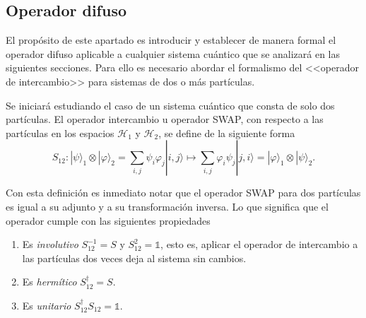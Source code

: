 \subsection{Operador difuso}\label{subsec:Cap2OperadorDifusas} %

El propósito de este apartado es introducir y establecer de manera formal el operador difuso aplicable a cualquier sistema cuántico que se analizará en las siguientes secciones. Para ello es necesario abordar el formalismo del <<operador de intercambio>> para sistemas de dos o más partículas.



Se iniciará estudiando el caso de un sistema cuántico que consta de solo dos partículas. El operador intercambio u operador SWAP, con respecto a las partículas en los espacios $\mathcal{H}_1$ y $\mathcal{H}_2$, se define de la siguiente forma\begin{equation}\label{swap}
S_{12}: |\psi\rangle_{1}\otimes |\varphi \rangle_{2}=\sum_{i,j}\psi_i\varphi_j|i,j\rangle \longmapsto     \sum_{i,j}\varphi_i\psi_j|j,i\rangle= |\varphi\rangle_{1}\otimes |\psi \rangle_{2}.
\end{equation} 

Con esta definición es inmediato notar que el operador SWAP para dos partículas es igual a su adjunto y a su transformación inversa. Lo que significa que el operador cumple con las siguientes propiedades\begin{enumerate}
    \item Es \textit{involutivo}   $S_{12}^{-1}={S}$ y ${S}_{12}^{2}=\mathds{1}$, esto es,  aplicar el operador de intercambio a las partículas dos veces deja al sistema sin cambios.
    \item Es \textit{hermítico} $ {S}_{12}^{\dagger}={S}$.
    \item Es \textit{unitario} $ {S}_{12}^{\dagger}{S}_{12}=\mathds{1}$.
\end{enumerate} 

